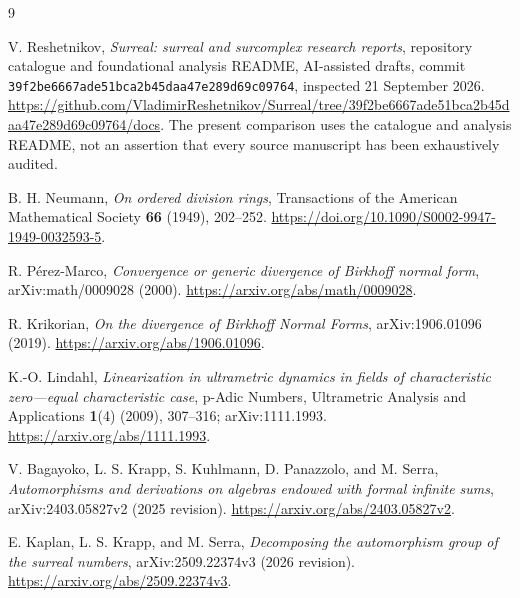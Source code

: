 \documentclass[11pt,letterpaper]{article}
\numberwithin{equation}{section}
\theoremstyle{definition}
\theoremstyle{remark}
\begin{document}
\begin{thebibliography}{9}
\raggedright
{}

V. Reshetnikov, \emph{Surreal: surreal and surcomplex research reports},
repository catalogue and foundational analysis README, AI-assisted drafts,
commit \texttt{39f2be6667ade51bca2b45daa47e289d69c09764}, inspected
21 September 2026.
\url{https://github.com/VladimirReshetnikov/Surreal/tree/39f2be6667ade51bca2b45daa47e289d69c09764/docs}.
The present comparison uses the catalogue and analysis README, not an
assertion that every source manuscript has been exhaustively audited.

B. H. Neumann, \emph{On ordered division rings},
Transactions of the American Mathematical Society \textbf{66} (1949),
202--252.
\url{https://doi.org/10.1090/S0002-9947-1949-0032593-5}.

R. P\'erez-Marco, \emph{Convergence or generic divergence of Birkhoff normal
form}, arXiv:math/0009028 (2000).
\url{https://arxiv.org/abs/math/0009028}.

R. Krikorian, \emph{On the divergence of Birkhoff Normal Forms},
arXiv:1906.01096 (2019).
\url{https://arxiv.org/abs/1906.01096}.

K.-O. Lindahl, \emph{Linearization in ultrametric dynamics in fields of
characteristic zero---equal characteristic case},
p-Adic Numbers, Ultrametric Analysis and Applications \textbf{1}(4)
(2009), 307--316; arXiv:1111.1993.
\url{https://arxiv.org/abs/1111.1993}.

V. Bagayoko, L. S. Krapp, S. Kuhlmann, D. Panazzolo, and M. Serra,
\emph{Automorphisms and derivations on algebras endowed with formal infinite
sums}, arXiv:2403.05827v2 (2025 revision).
\url{https://arxiv.org/abs/2403.05827v2}.

E. Kaplan, L. S. Krapp, and M. Serra,
\emph{Decomposing the automorphism group of the surreal numbers},
arXiv:2509.22374v3 (2026 revision).
\url{https://arxiv.org/abs/2509.22374v3}.

\end{thebibliography}
\end{document}
